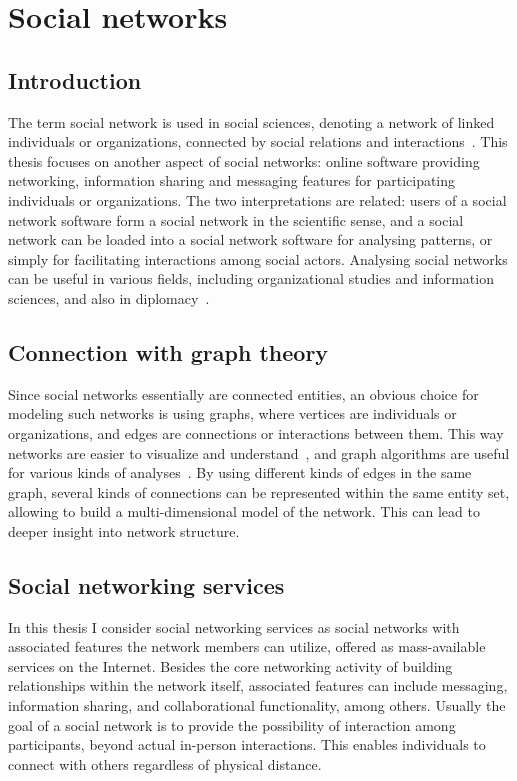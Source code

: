 \section{Social networks}

\subsection{Introduction}

The term social network is used in social sciences, denoting a network of linked individuals or organizations, connected by social relations and interactions~\cite{Borgatti892}. This thesis focuses on another aspect of social networks: online software providing networking, information sharing and messaging features for participating individuals or organizations. The two interpretations are related: users of a social network software form a social network in the scientific sense, and a social network can be loaded into a social network software for analysing patterns, or simply for facilitating interactions among social actors. Analysing social networks can be useful in various fields, including organizational studies and information sciences, and also in diplomacy~\cite{networkdiplomacy}.

\subsection{Connection with graph theory}

Since social networks essentially are connected entities, an obvious choice for modeling such networks is using graphs, where vertices are individuals or organizations, and edges are connections or interactions between them. This way networks are easier to visualize and understand~\cite{socialnetworkvisualization}, and graph algorithms are useful for various kinds of analyses~\cite{socialnetworkanalysis}. By using different kinds of edges in the same graph, several kinds of connections can be represented within the same entity set, allowing to build a multi-dimensional model of the network. This can lead to deeper insight into network structure.

\subsection{Social networking services}

In this thesis I consider social networking services as social networks with associated features the network members can utilize, offered as mass-available services on the Internet. Besides the core networking activity of building relationships within the network itself, associated features can include messaging, information sharing, and collaborational functionality, among others. Usually the goal of a social network is to provide the possibility of interaction among participants, beyond actual in-person interactions. This enables individuals to connect with others regardless of physical distance.

